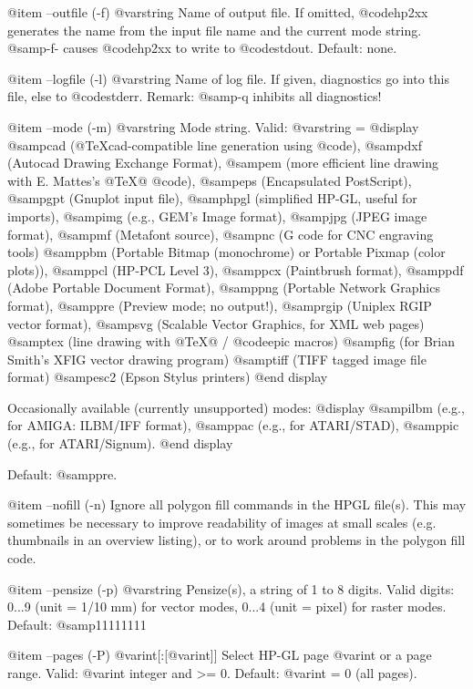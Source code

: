 @item --outfile (-f) @var{string}
Name of output file. If omitted, @code{hp2xx} generates the name from
the input file name and the current mode string. @samp{-f-} causes
@code{hp2xx} to write to @code{stdout}. Default: none.

@item --logfile (-l) @var{string}
Name of log file. If given, diagnostics go into this file, else to
@code{stderr}. Remark: @samp{-q} inhibits all diagnostics!

@item --mode (-m) @var{string}
Mode string. Valid: @var{string} =
@display
  @samp{cad}  (@TeX{}cad-compatible line generation using @code{}),
  @samp{dxf}  (Autocad Drawing Exchange Format),
  @samp{em}   (more efficient line drawing with E. Mattes's @TeX{}@ @code{}),
  @samp{eps}  (Encapsulated PostScript),
  @samp{gpt}  (Gnuplot input file),
  @samp{hpgl} (simplified HP-GL, useful for imports),
  @samp{img}  (e.g., GEM's Image format),
  @samp{jpg}  (JPEG image format),
  @samp{mf}   (Metafont source),
  @samp{nc}   (G code for CNC engraving tools)
  @samp{pbm}  (Portable Bitmap (monochrome) or Portable Pixmap (color plots)),
  @samp{pcl}  (HP-PCL Level 3),
  @samp{pcx}  (Paintbrush format),
  @samp{pdf}  (Adobe Portable Document Format),
  @samp{png}  (Portable Network Graphics format),
  @samp{pre}  (Preview mode; no output!),
  @samp{rgip} (Uniplex RGIP vector format),
  @samp{svg}  (Scalable Vector Graphics, for XML web pages)
  @samp{tex}  (line drawing with @TeX{}@ / @code{epic} macros)
  @samp{fig}  (for Brian Smith's XFIG vector drawing program)
  @samp{tiff} (TIFF tagged image file format)
  @samp{esc2} (Epson Stylus printers)
@end display

Occasionally available (currently unsupported) modes:
@display
  @samp{ilbm} (e.g., for AMIGA: ILBM/IFF format),
  @samp{pac}  (e.g., for ATARI/STAD),
  @samp{pic}  (e.g., for ATARI/Signum).
@end display

Default: @samp{pre}.

@item --nofill (-n)
Ignore all polygon fill commands in the HPGL file(s). This may sometimes
be necessary to improve readability of images at small scales (e.g. thumbnails in
an overview listing), or to work around problems in the polygon fill code. 

@item --pensize (-p) @var{string}
Pensize(s), a string of 1 to 8 digits.
Valid digits: 0...9 (unit = 1/10 mm) for vector modes,
0...4 (unit = pixel) for raster modes. Default: @samp{11111111}

@item --pages (-P) @var{int}[:[@var{int}]]
Select HP-GL page @var{int} or a page range.
Valid: @var{int} integer and >= 0. Default: @var{int} = 0 (all pages).

